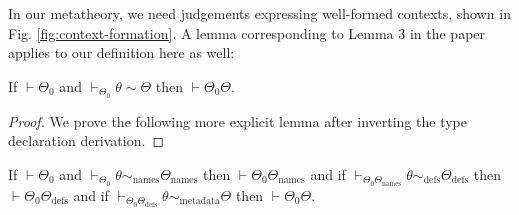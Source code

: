 In our metatheory, we need judgements expressing well-formed contexts, shown in Fig. \ref{fig:context-formation}. A lemma corresponding to Lemma 3 in the paper applies to our definition here as well:
\begin{lemma}
If $\vdash \Theta_0$ and $\vdash_{\Theta_0} \theta \sim \Theta$ then $\vdash \Theta_{0}\Theta$.
\end{lemma}
\begin{proof}
We prove the following more explicit lemma after inverting the type declaration derivation.
\end{proof}
\begin{lemma}
If $\vdash \Theta_0$ and $\vdash_{\Theta_0} \theta \sim_{\text{names}} \Theta_{\text{names}}$ then $\vdash\Theta_0\Theta_{\text{names}}$ and if $\vdash_{\Theta_0\Theta_{\text{names}}} \theta \sim_{\text{defs}} \Theta_{\text{defs}}$ then $\vdash \Theta_0\Theta_{\text{defs}} $ and if $\vdash_{\Theta_0\Theta_{\text{defs}}} \theta \sim_{\text{metadata}} \Theta$ then $\vdash \Theta_0\Theta$.
\end{lemma}
